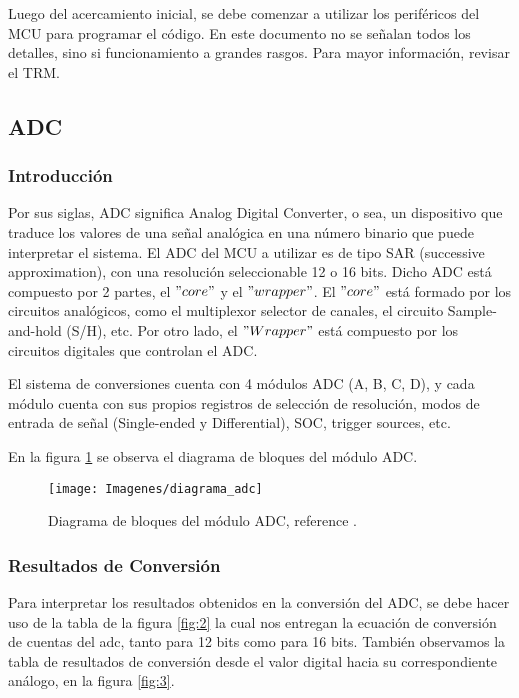 Luego del acercamiento inicial, se debe comenzar a utilizar los periféricos del MCU para programar el código. En este documento no se señalan todos los detalles, sino si funcionamiento a grandes rasgos. Para mayor información, revisar el TRM.

\subsection{ADC}
\subsubsection{Introducción}
Por sus siglas, ADC significa Analog Digital Converter, o sea, un dispositivo que traduce los valores de una señal analógica en una número binario que puede interpretar el sistema. El ADC del MCU a utilizar es de tipo SAR (successive approximation), con una resolución seleccionable 12 o 16 bits. Dicho ADC está compuesto por 2 partes, el $"core"$ y el $"wrapper"$. El $"core"$ está formado por los circuitos analógicos, como el multiplexor selector de canales, el circuito Sample-and-hold (S/H), etc. Por otro lado, el $"Wrapper"$ está compuesto por los circuitos digitales que controlan el ADC.\par
El sistema de conversiones cuenta con 4 módulos ADC (A, B, C, D), y cada módulo cuenta con sus propios registros de selección de resolución, modos de entrada de señal (Single-ended y Differential), SOC, trigger sources, etc.

En la figura \ref{fig:1} se observa el diagrama de bloques del módulo ADC.


\begin{figure}[h]
	\centering
	\texttt{[image: Imagenes/diagrama\_adc]}
	\caption{Diagrama de bloques del módulo ADC, reference \cite[page 1555]{tmr}.}
	\label{fig:1}
\end{figure}

\subsubsection{Resultados de Conversión}
Para interpretar los resultados obtenidos en la conversión del ADC, se debe hacer uso de la tabla de la figura \ref{fig:2} la cual nos entregan la ecuación de conversión de cuentas del adc, tanto para 12 bits como para 16 bits. También observamos la tabla de resultados de conversión desde el valor digital hacia su correspondiente análogo, en la figura \ref{fig:3}.

